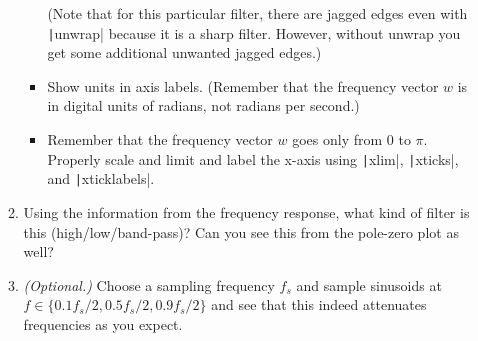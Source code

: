 \documentclass{article}
\begin{document}
\begin{enumerate}
\begin{enumerate}
\begin{itemize}
      (Note that for this particular filter, there are jagged edges even with \texttt|unwrap| because it is a sharp filter. However, without unwrap you get some additional unwanted jagged edges.)
    \item Show units in axis labels. (Remember that the frequency vector $w$ is in digital units of radians, not radians per second.)
    \item Remember that the frequency vector $w$ goes only from $0$ to $\pi$. Properly scale and limit and label the x-axis using \texttt|xlim|, \texttt|xticks|, and \texttt|xticklabels|.
    \end{itemize}

  \item Using the information from the frequency response, what kind of filter is this (high/low/band-pass)? Can you see this from the pole-zero plot as well?

  \item \textit{(Optional.)} Choose a sampling frequency $f_s$ and sample sinusoids at $f\in\{0.1f_s/2,0.5f_s/2,0.9f_s/2\}$ and see that this indeed attenuates frequencies as you expect.
  \end{enumerate}
\end{enumerate}
\end{document}
